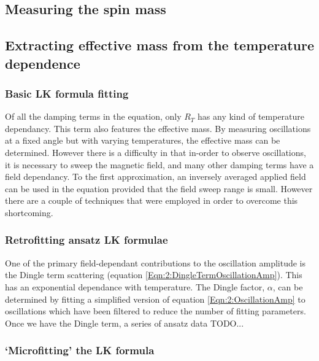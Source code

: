 \subsection{Measuring the spin mass}

\subsection{Extracting effective mass from the temperature dependence}
\label{Sec:2:ExtractingEffMassTemperatureDependence}

\subsubsection{Basic LK formula fitting}

Of all the damping terms in the \LK equation, only $R_T$ has any kind of temperature dependancy. This term also features the effective mass. By measuring oscillations at a fixed angle but with varying temperatures, the effective mass can be determined. However there is a difficulty in that in-order to observe oscillations, it is necessary to sweep the magnetic field, and many other damping terms have a field dependancy. To the first approximation, an inversely averaged applied field can be used in the \LK equation provided that the field sweep range is small. However there are a couple of techniques that were employed in order to overcome this shortcoming.

\subsubsection{Retrofitting ansatz LK formulae}
\label{Sec:2:LKRetrofitting}

One of the primary field-dependant contributions to the oscillation amplitude is the Dingle term scattering (equation \ref{Eqn:2:DingleTermOscillationAmp}). This has an exponential dependance with temperature. The Dingle factor, $\alpha$, can be determined by fitting a simplified version of equation \ref{Eqn:2:OscillationAmp} to oscillations which have been filtered to reduce the number of fitting parameters. Once we have the Dingle term, a series of ansatz data TODO...




\subsubsection{`Microfitting' the LK formula}
\label{Sec:2:LKMicrofitting}

